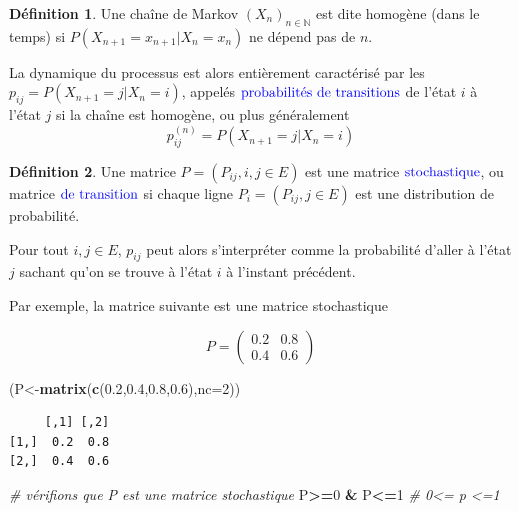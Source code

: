 \documentclass[
]{book}
\newenvironment{Shaded}{\begin{snugshade}}{\end{snugshade}}
\newcommand{\CommentTok}[1]{\textcolor[rgb]{0.56,0.35,0.01}{\textit{#1}}}
\newcommand{\DataTypeTok}[1]{\textcolor[rgb]{0.13,0.29,0.53}{#1}}
\newcommand{\DecValTok}[1]{\textcolor[rgb]{0.00,0.00,0.81}{#1}}
\newcommand{\FloatTok}[1]{\textcolor[rgb]{0.00,0.00,0.81}{#1}}
\newcommand{\KeywordTok}[1]{\textcolor[rgb]{0.13,0.29,0.53}{\textbf{#1}}}
\newcommand{\NormalTok}[1]{#1}
\newcommand{\OperatorTok}[1]{\textcolor[rgb]{0.81,0.36,0.00}{\textbf{#1}}}
\newcommand{\StringTok}[1]{\textcolor[rgb]{0.31,0.60,0.02}{#1}}
\theoremstyle{definition}
\newtheorem{definition}{Définition}[chapter]
\theoremstyle{definition}
\theoremstyle{definition}
\theoremstyle{remark}
\begin{document}
\begin{definition}
\protect\hypertarget{def:unnamed-chunk-5}{}{\label{def:unnamed-chunk-5} }Une chaîne de Markov \((X_n)_{n \in \mathbb{N}}\) est dite homogène (dans le temps) si \(P(X_{n+1}=x_{n+1}|X_n=x_n)\) ne dépend pas de \(n\).
\end{definition}

La dynamique du processus est alors entièrement caractérisé par les \(p_{ij}=P(X_{n+1}=j|X_n=i)\), appelés \(\color{blue}{\mathbf{\text{probabilités de transitions}}}\) de l'état \(i\) à l'état \(j\) si la chaîne est homogène, ou plus généralement
\[ p_{ij}^{(n)}=P(X_{n+1}=j|X_n=i)\]
\begin{definition}
\protect\hypertarget{def:unnamed-chunk-6}{}{\label{def:unnamed-chunk-6} }Une matrice \(P=(P_{ij},i,j \in E)\) est une matrice \(\color{blue}{\mathbf{\text{stochastique}}}\), ou matrice \(\color{blue}{\mathbf{\text{de transition}}}\) si chaque ligne \(P_i=(P_{ij}, j \in E)\) est une distribution de probabilité.
\end{definition}

Pour tout \(i,j \in E\), \(p_{ij}\) peut alors s'interpréter comme la probabilité d'aller à l'état \(j\) sachant qu'on se trouve à l'état \(i\) à l'instant précédent.

Par exemple, la matrice suivante est une matrice stochastique

\[
P=\left( 
\begin{array}{cc}
0.2 & 0.8\\
0.4 & 0.6
\end{array}
\right)
\]

\begin{Shaded}
\begin{Highlighting}[]
\NormalTok{(P<-}\KeywordTok{matrix}\NormalTok{(}\KeywordTok{c}\NormalTok{(}\FloatTok{0.2}\NormalTok{,}\FloatTok{0.4}\NormalTok{,}\FloatTok{0.8}\NormalTok{,}\FloatTok{0.6}\NormalTok{),}\DataTypeTok{nc=}\DecValTok{2}\NormalTok{))}
\end{Highlighting}
\end{Shaded}

\begin{verbatim}
     [,1] [,2]
[1,]  0.2  0.8
[2,]  0.4  0.6
\end{verbatim}

\begin{Shaded}
\begin{Highlighting}[]
\CommentTok{# vérifions que P est une matrice stochastique}
\NormalTok{P}\OperatorTok{>=}\DecValTok{0} \OperatorTok{&}\StringTok{ }\NormalTok{P}\OperatorTok{<=}\DecValTok{1}  \CommentTok{# 0<= p <=1}
\end{Highlighting}
\end{Shaded}
\end{document}
